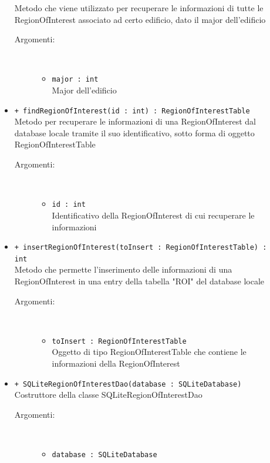 \documentclass[../DefinizioneDiProdotto.tex]{subfiles}
\begin{document}
\begin{description}
\begin{itemize}
Metodo che viene utilizzato per recuperare le informazioni di tutte le RegionOfInterest associato ad certo edificio, dato il major dell'edificio
 \begin{description}
\item[Argomenti:] \
\begin{itemize}
\item \texttt{major : int}\\
Major dell'edificio\end{itemize}
\end{description}
\item \texttt{+ findRegionOfInterest(id : int) : RegionOfInterestTable}\\
Metodo per recuperare le informazioni di una RegionOfInterest dal database locale tramite il suo identificativo, sotto forma di oggetto RegionOfInterestTable
 \begin{description}
\item[Argomenti:] \
\begin{itemize}
\item \texttt{id : int}\\
Identificativo della RegionOfInterest di cui recuperare le informazioni\end{itemize}
\end{description}
\item \texttt{+ insertRegionOfInterest(toInsert : RegionOfInterestTable) : int}\\
Metodo che permette l'inserimento delle informazioni di una RegionOfInterest in una entry della tabella "ROI" del database locale
 \begin{description}
\item[Argomenti:] \
\begin{itemize}
\item \texttt{toInsert : RegionOfInterestTable}\\
Oggetto di tipo RegionOfInterestTable che contiene le informazioni della RegionOfInterest\end{itemize}
\end{description}
\item \texttt{+ SQLiteRegionOfInterestDao(database : SQLiteDatabase)}\\
Costruttore della classe SQLiteRegionOfInterestDao
 \begin{description}
\item[Argomenti:] \
\begin{itemize}
\item \texttt{database : SQLiteDatabase}\\

\end{itemize}
\end{description}
\end{itemize}
\end{description}
\end{document}
